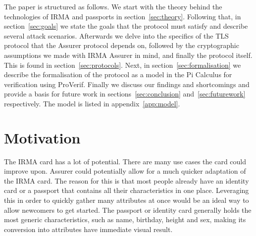 The paper is structured as follows. We start with the theory behind the technologies of IRMA and passports in section~\ref{sec:theory}. Following that, in section~\ref{sec:goals} we state the goals that the protocol must satisfy and describe several attack scenarios. Afterwards we delve into the specifics of the TLS protocol that the Assurer protocol depends on, followed by the cryptographic assumptions we made with IRMA Assurer in mind, and finally the protocol itself. This is found in section~\ref{sec:protocols}. Next, in section~\ref{sec:formalisation} we describe the formalisation of the protocol as a model in the Pi Calculus for verification using ProVerif. Finally we discuss our findings and shortcomings and provide a basis for future work in sections~\ref{sec:conclusion} and~\ref{sec:futurework} respectively. The model is listed in appendix~\ref{app:model}.

\section{Motivation}
The IRMA card has a lot of potential. There are many use cases the card could improve upon. Assurer could potentially allow for a much quicker adaptation of the IRMA card. The reason for this is that most people already have an identity card or a passport that contains all their characteristics in one place. Leveraging this in order to quickly gather many attributes at once would be an ideal way to allow newcomers to get started. The passport or identity card generally holds the most generic characteristics, such as name, birthday, height and sex, making its conversion into attributes have immediate visual result.
